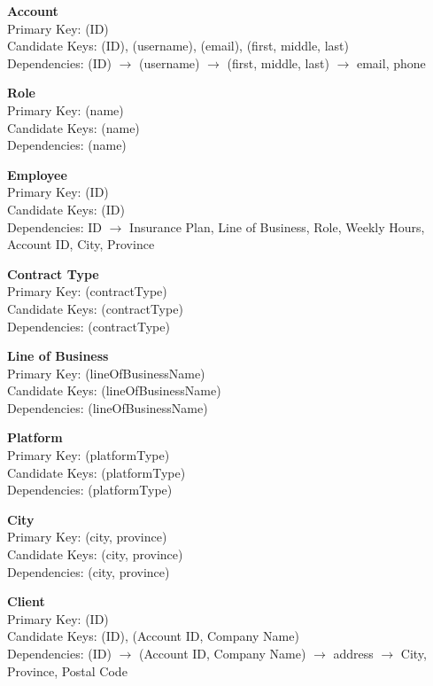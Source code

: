 \documentclass[12pt, letterpaper]{article}
\begin{document}
 

\pagestyle{fancy}
\inputminted{sql}{Workbench_Model.sql}
\textbf{Account}\\ 
Primary Key: (ID)\\ 
Candidate Keys: (ID), (username), (email), (first, middle, last)\\ 
Dependencies: (ID) $\rightarrow$ (username) $\rightarrow$ (first, middle, last) $\rightarrow$ email, phone

\textbf{Role}\\ 
Primary Key: (name)\\ 
Candidate Keys: (name)\\
Dependencies: (name)

\textbf{Employee}\\ 
Primary Key: (ID)\\ 
Candidate Keys: (ID)\\
Dependencies: ID $\rightarrow$ Insurance Plan, Line of Business, Role, Weekly Hours, Account ID, City, Province

\textbf{Contract Type}\\ 
Primary Key: (contractType)\\ 
Candidate Keys: (contractType)\\
Dependencies: (contractType)

\textbf{Line of Business}\\ 
Primary Key: (lineOfBusinessName)\\ 
Candidate Keys: (lineOfBusinessName)\\
Dependencies: (lineOfBusinessName)

\textbf{Platform}\\ 
Primary Key: (platformType)\\ 
Candidate Keys: (platformType)\\
Dependencies: (platformType)

\textbf{City}\\ 
Primary Key: (city, province)\\ 
Candidate Keys: (city, province)\\
Dependencies: (city, province)

\textbf{Client}\\
Primary Key: (ID)\\
Candidate Keys: (ID), (Account ID, Company Name)\\
Dependencies: (ID) $\rightarrow$ (Account ID, Company Name) $\rightarrow$ address $\rightarrow$ City, Province, Postal Code
\end{document}
